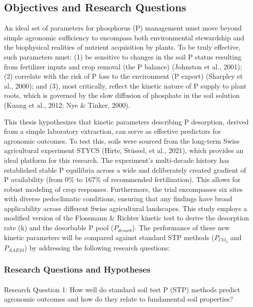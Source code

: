 \documentclass[
  a4paper,
]{article}
\makeatletter
\let\oldparagraph\paragraph
\renewcommand{\paragraph}{
    \@ifstar
      \xxxParagraphStar
      \xxxParagraphNoStar
  }
\newcommand{\xxxParagraphStar}[1]{\oldparagraph*{#1}\mbox{}}
\newcommand{\xxxParagraphNoStar}[1]{\oldparagraph{#1}\mbox{}}
\makeatother
\begin{document}
\subsection{Objectives and Research
Questions}\label{objectives-and-research-questions}

An ideal set of parameters for phosphorus (P) management must move
beyond simple agronomic sufficiency to encompass both environmental
stewardship and the biophysical realities of nutrient acquisition by
plants. To be truly effective, such parameters must: (1) be sensitive to
changes in the soil P status resulting from fertilizer inputs and crop
removal (the P balance) (Johnston et al., 2001); (2) correlate with the
risk of P loss to the environment (P export) (Sharpley et al., 2000);
and (3), most critically, reflect the kinetic nature of P supply to
plant roots, which is governed by the slow diffusion of phosphate in the
soil solution (Kuang et al., 2012; Nye \& Tinker, 2000).

This thesis hypothesizes that kinetic parameters describing P
desorption, derived from a simple laboratory extraction, can serve as
effective predictors for agronomic outcomes. To test this, soils were
sourced from the long-term Swiss agricultural experiment STYCS (Hirte,
Stüssel, et al., 2021), which provides an ideal platform for this
research. The experiment's multi-decade history has established stable P
equilibria across a wide and deliberately created gradient of P
availability (from 0\% to 167\% of recommended fertilization). This
allows for robust modeling of crop responses. Furthermore, the trial
encompasses six sites with diverse pedoclimatic conditions, ensuring
that any findings have broad applicability across different Swiss
agricultural landscapes. This study employs a modified version of the
Flossmann \& Richter kinetic test to derive the desorption rate (k) and
the desorbable P pool (\(P_{desorb}\)). The performance of these new
kinetic parameters will be compared against standard STP methods
(\(P_{CO_2}\) and \(P_{AAE10}\)) by addressing the following research
questions:

\subsubsection{Research Questions and
Hypotheses}\label{research-questions-and-hypotheses}

\paragraph{Research Question 1: How well do standard soil test P (STP)
methods predict agronomic outcomes and how do they relate to fundamental
soil
properties?}\label{research-question-1-how-well-do-standard-soil-test-p-stp-methods-predict-agronomic-outcomes-and-how-do-they-relate-to-fundamental-soil-properties}
\end{document}
